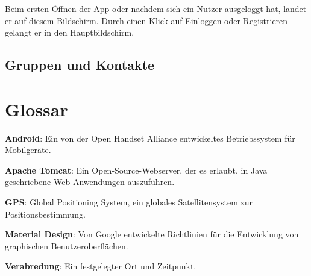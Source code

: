\documentclass[parskip=full,11pt]{scrartcl}
\begin{document}
Beim ersten Öffnen der App oder nachdem sich ein Nutzer ausgeloggt hat, landet er auf diesem Bildschirm.
Durch einen Klick auf Einloggen oder Registrieren gelangt er in den Hauptbildschirm.

\subsection{Gruppen und Kontakte}



\section{Glossar}

\textbf{Android}:
Ein von der Open Handset Alliance entwickeltes Betriebssystem für Mobilgeräte.

\textbf{Apache Tomcat}:
Ein Open-Source-Webserver, der es erlaubt, in Java geschriebene Web-Anwendungen
auszuführen.

\textbf{GPS}:
Global Positioning System, ein globales Satellitensystem zur
Positionsbestimmung.

\textbf{Material Design}:
Von Google entwickelte Richtlinien für die Entwicklung von graphischen
Benutzeroberflächen.

\textbf{Verabredung}:
Ein festgelegter Ort und Zeitpunkt.
\end{document}
